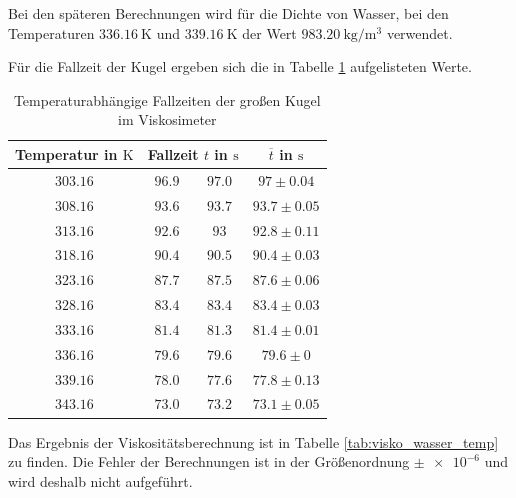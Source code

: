 Bei den späteren Berechnungen wird für die Dichte von Wasser, bei den Temperaturen $\SI{336.16}{\kelvin}$ und $\SI{339.16}{\kelvin}$
der Wert $\SI{983.20}{\kilogram\per\cubic\meter}$ verwendet. %

Für die Fallzeit der Kugel ergeben sich die in  %
Tabelle \ref{tab:messwerte_fallzeit_kugel_gross_temo} aufgelisteten Werte.

\begin{table}
\centering
\begin{tabular} {cccc}
  \toprule
  Temperatur in $\si{\kelvin}$ & \multicolumn{2}{c}{Fallzeit $t$ in $\si{\second}$} & $\overline{t}$ in $\si{\second}$ \\
  \midrule
  $\num{303.16}$ & $\num{96.9}$  & $\num{97.0}$ & $\num{97}\pm\num{0.04}$ \\
  $\num{308.16}$ & $\num{93.6}$  & $\num{93.7}$ & $\num{93.7}\pm\num{0.05}$ \\
  $\num{313.16}$ & $\num{92.6}$ & $\num{93}$   & $\num{92.8}\pm\num{0.11}$ \\
  $\num{318.16}$ & $\num{90.4}$ & $\num{90.5}$ &  $\num{90.4}\pm\num{0.03}$ \\
  $\num{323.16}$ & $\num{87.7}$ & $\num{87.5}$ & $\num{87.6}\pm\num{0.06}$ \\
  $\num{328.16}$ & $\num{83.4}$ & $\num{83.4}$ & $\num{83.4}\pm\num{0.03}$ \\
  $\num{333.16}$ & $\num{81.4}$ & $\num{81.3}$ & $\num{81.4}\pm\num{0.01}$ \\
  $\num{336.16}$ & $\num{79.6}$ & $\num{79.6}$ & $\num{79.6}\pm\num{0}$ \\
  $\num{339.16}$ & $\num{78.0}$ &  $\num{77.6}$ & $\num{77.8}\pm\num{0.13}$ \\
  $\num{343.16}$ & $\num{73.0}$ & $\num{73.2}$ & $\num{73.1}\pm\num{0.05}$ \\
\bottomrule
\end{tabular}
\caption{Temperaturabhängige Fallzeiten der großen Kugel im Viskosimeter} %
\label{tab:messwerte_fallzeit_kugel_gross_temo}
\end{table}

Das Ergebnis der Viskositätsberechnung ist in Tabelle \ref{tab:visko_wasser_temp} zu finden. %
Die Fehler der Berechnungen ist in der Größenordnung $\pm \num{e-6}$ und 
wird deshalb nicht aufgeführt.

